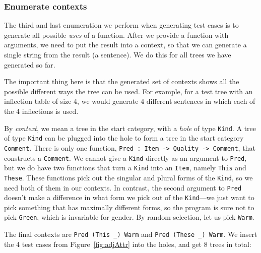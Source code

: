 \documentclass[runningheads]{llncs}
\def\t#1{\texttt{#1}}
\begin{document}
\subsubsection{Enumerate contexts} The third and last enumeration we perform when generating test cases is to generate all possible \emph{uses} of a function. After we provide a function with arguments, we need to put the result into a context, so that we can generate a single string from the result (a sentence). We do this for all trees we have generated so far.

The important thing here is that the generated set of contexts shows all the possible different ways the tree can be used. For example, for a test tree with an inflection table of size 4, we would generate 4 different sentences in which each of the 4 inflections is used.

By \emph{context}, we mean a tree in
the start category, with a \emph{hole} of type \t{Kind}. A tree of
type \t{Kind} can be plugged into the hole to form a tree in the start
category \t{Comment}. There is only one function, \t{Pred : Item ->
  Quality -> Comment}, that constructs a \t{Comment}. 
We cannot give a \t{Kind} directly as an argument to \t{Pred}, but we
do have two functions that turn a \t{Kind} into an \t{Item}, namely \t{This} and
\t{These}. These functions pick out the singular and plural forms of
the \t{Kind}, so we need both of them in our contexts.
In contrast, the second argument to \t{Pred} doesn't make a difference
in what form we pick out of the \t{Kind}---we just want to pick
something that has maximally different forms, so the program is sure
not to pick \t{Green}, which is invariable for gender. By random
selection, let us pick \t{Warm}.

The final contexts are \verb|Pred (This _) Warm| and \verb|Pred (These _) Warm|.
We insert the 4 test cases from Figure~\ref{fig:adjAttr} into the
holes, and get 8 trees in total: 
\end{document}
